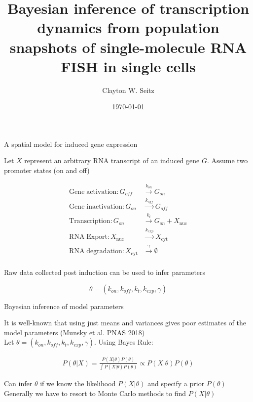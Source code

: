\documentclass[aspectratio=1610]{beamer}					%
\title{Bayesian inference of transcription dynamics from population snapshots of single-molecule RNA FISH in single cells}	%
\author{Clayton W. Seitz}								%
\date{\today}									%
\begin{document}
\begin{frame}
  \titlepage
\end{frame}


%


\begin{frame}{A spatial model for induced gene expression}

Let $X$ represent an arbitrary RNA transcript of an induced gene $G$. Assume two promoter states (on and off)

\begin{align*}
\mathrm{Gene\;activation}: G_{off} &\overset{k_{on}}{\rightarrow} G_{on}\\
\mathrm{Gene\;inactivation}: G_{on} &\overset{k_{off}}{\rightarrow} G_{off}\\
\mathrm{Transcription}: G_{on} &\overset{k_{t}}{\rightarrow} G_{on} + X_{\mathrm{nuc}}\\
\mathrm{RNA \;Export}: X_{\mathrm{nuc}} &\overset{k_{exp}}{\rightarrow} X_{\mathrm{cyt}}\\
\mathrm{RNA\; degradation}: X_{\mathrm{cyt}} &\overset{\gamma}{\rightarrow} \emptyset\\
\end{align*}

Raw data collected post induction can be used to infer parameters

\begin{equation*}
\theta = \left( k_{on},k_{off},k_{t},k_{exp},\gamma\right)
\end{equation*}

\end{frame}

\begin{frame}{Bayesian inference of model parameters}

It is well-known that using just means and variances gives poor estimates of the model parameters (Munsky et al. PNAS 2018)\\
\vspace{0.2in}
Let $\theta = \left( k_{on},k_{off},k_{t},k_{exp},\gamma\right)$. Using Bayes Rule: 

\begin{align*}
P(\theta|X) = \frac{P(X|\theta)P(\theta)}{\int P(X|\theta)P(\theta)} \propto P(X|\theta)P(\theta)
\end{align*}

Can infer $\theta$ if we know the likelihood $P(X|\theta)$ and specify a prior $P(\theta)$\\
\vspace{0.2in}
Generally we have to resort to Monte Carlo methods to find $P(X|\theta)$

\end{frame}
\end{document}
